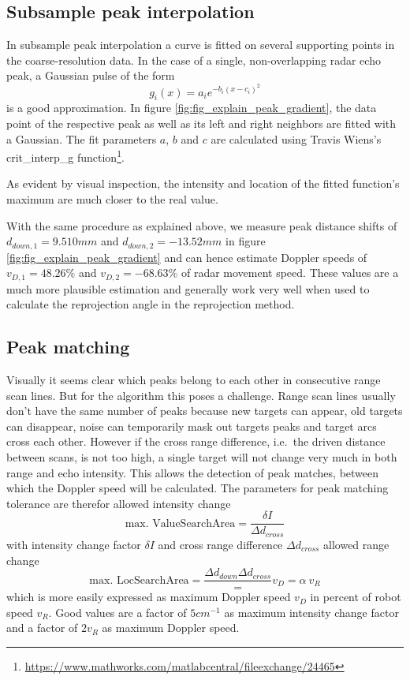 \subsection{Subsample peak interpolation}\label{subsample-peak-interpolation}

In subsample peak interpolation a curve is fitted on several supporting
points in the coarse-resolution data. In the case of a single,
non-overlapping radar echo peak, a Gaussian pulse of the form
\[g_i(x) = a_i e^{-b_i ( x - c_i )^2}\] is a good approximation. In
figure \cref{fig:fig_explain_peak_gradient}, the data point of the respective peak as well as its left
and right neighbors are fitted with a Gaussian. The fit parameters
\(a\), \(b\) and \(c\) are calculated using Travis
Wiens's crit\_interp\_g function\footnote{\url{https://www.mathworks.com/matlabcentral/fileexchange/24465}}.

As evident by visual inspection, the intensity and location of the
fitted function's maximum are much closer to the real value.

With the same procedure as explained above, we measure peak distance
shifts of \(d_{down,1}=9.510mm\) and \(d_{down,2}=-13.52mm\) in figure
\cref{fig:fig_explain_peak_gradient} and can hence estimate Doppler speeds of \(v_{D,1}=48.26\%\) and
\(v_{D,2}=-68.63\%\) of radar movement speed. These values are a much
more plausible estimation and generally work very well when used to
calculate the reprojection angle in the reprojection method.

\subsection{Peak matching}\label{peak-matching}

Visually it seems clear which peaks belong to each other in consecutive
range scan lines. But for the algorithm this poses a challenge. Range
scan lines usually don't have the same number of peaks because new
targets can appear, old targets can disappear, noise can temporarily
mask out targets peaks and target arcs cross each other. However if the
cross range difference, i.e.~the driven distance between scans, is not
too high, a single target will not change very much in both range and
echo intensity. This allows the detection of peak matches, between which
the Doppler speed will be calculated. The parameters for peak matching
tolerance are therefor allowed intensity change
\[
    \text{max. ValueSearchArea} = \frac{\delta I}{\Delta d_{cross}}
\]
with intensity change factor \(\delta I\) and cross range difference
\(\Delta d_{cross}\) allowed range change
\[
    \text{max. LocSearchArea} = \frac{\Delta d_{down}{\Delta d_{cross}}} = v_D = \alpha~v_R
\]
which is more easily expressed as maximum Doppler speed \(v_D\) in
percent of robot speed \(v_R\). Good values are a factor of
\(5 cm^{-1}\) as maximum intensity change factor and a factor of
\(2 v_R\) as maximum Doppler speed.

